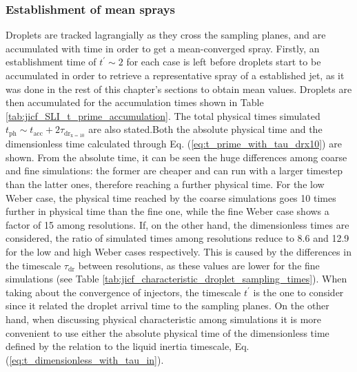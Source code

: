 \subsubsection*{Establishment of mean sprays}

Droplets are tracked lagrangially as they cross the sampling planes, and are accumulated with time in order to get a mean-converged spray. Firstly, an establishment time of $t^{\prime} \sim 2$ for each case is left before droplets start to be accumulated in order to retrieve a representative spray of a established jet, as it was done in the rest of this chapter's sections to obtain mean values. Droplets are then accumulated for the accumulation times shown in Table \ref{tab:jicf_SLI_t_prime_accumulation}. The total physical times simulated $t_\mathrm{ph} \sim t_\mathrm{acc} + 2 \tau_\mathrm{dr_{x=10}}$ are also stated.Both the absolute physical time and the dimensionless time calculated through Eq. (\ref{eq:t_prime_with_tau_drx10}) are shown. From the absolute time, it can be seen the huge differences among coarse and fine simulations: the former are cheaper and can run with a larger timestep than the latter ones, therefore reaching a further physical time. For the low Weber case, the physical time reached by the coarse simulations goes 10 times further in physical time than the fine one, while the fine Weber case shows a factor of 15 among resolutions. If, on the other hand, the dimensionless times are considered, the ratio of simulated times among resolutions reduce to 8.6 and 12.9 for the low and high Weber cases respectively. This is caused by the differences in the timescale $\tau_\mathrm{dr}$ between resolutions, as these values are lower for the fine simulations (see Table \ref{tab:jicf_characteristic_droplet_sampling_times}). When taking about the convergence of injectors, the timescale $t^{\prime}$ is the one to consider since it related the droplet arrival time to the sampling planes. On the other hand, when discussing physical characteristic among simulations it is more convenient to use either the absolute physical time of the dimensionless time defined by the relation to the liquid inertia timescale, Eq. (\ref{eq:t_dimensionless_with_tau_in}).


